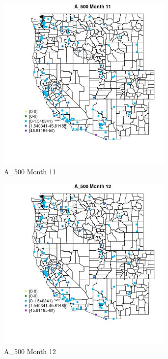 \begin{figure} 
\centering  
\includegraphics[width=0.77\textwidth]{Code_Outputs/Report_ML_input_PM25_Step4_part_e_de_duplicated_aves_MapObsMo11A_500.jpg} 
\caption{\label{fig:Report_ML_input_PM25_Step4_part_e_de_duplicated_avesMapObsMo11A_500}A_500 Month 11} 
\end{figure} 
 

\begin{figure} 
\centering  
\includegraphics[width=0.77\textwidth]{Code_Outputs/Report_ML_input_PM25_Step4_part_e_de_duplicated_aves_MapObsMo12A_500.jpg} 
\caption{\label{fig:Report_ML_input_PM25_Step4_part_e_de_duplicated_avesMapObsMo12A_500}A_500 Month 12} 
\end{figure} 
 


